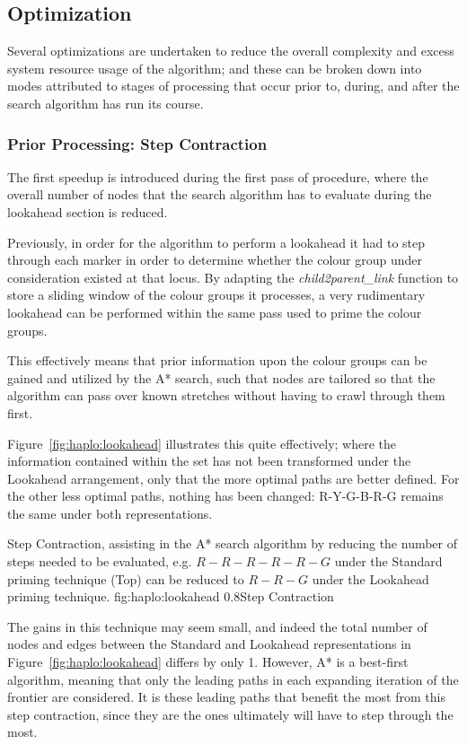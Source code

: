 \subsection{Optimization}

Several optimizations are undertaken to reduce the overall complexity and excess system resource usage of the algorithm; and these can be broken down into modes attributed to stages of processing that occur prior to, during, and after the search algorithm has run its course.

\subsubsection{Prior Processing: Step Contraction}

The first speedup is introduced during the first pass of procedure, where the overall number of nodes that the search algorithm has to evaluate during the lookahead section is reduced. 

Previously, in order for the algorithm to perform a lookahead it had to step through each marker in order to determine whether the colour group under consideration existed at that locus. By adapting the \textit{child2parent\_link} function to store a sliding window of the colour groups it processes, a very rudimentary lookahead can be performed within the same pass used to prime the colour groups.  

This effectively means that prior information upon the colour groups can be gained and utilized by the A* search, such that nodes are tailored so that the algorithm can pass over known stretches without having to crawl through them first.

Figure~\ref{fig:haplo:lookahead}  illustrates this quite effectively; where the information contained within the set has not been transformed under the Lookahead arrangement, only that the more optimal paths are better defined. For the other less optimal paths, nothing has been changed: R-Y-G-B-R-G remains the same under both representations.

	{Step Contraction, assisting in the A* search algorithm by reducing the number of steps needed to be evaluated, e.g. $R-R-R-R-R-G$ under the Standard priming technique (Top) can be reduced to $R-R-G$ under the Lookahead priming technique.}
	{fig:haplo:lookahead}
	{0.8}{Step Contraction}

The gains in this technique may seem small, and indeed the total number of nodes and edges between the Standard and Lookahead representations in Figure~\ref{fig:haplo:lookahead} differs by only 1. However, A* is a best-first algorithm, meaning that only the leading paths in each expanding iteration of the frontier are considered. It is these leading paths that benefit the most from this step contraction, since they are the ones ultimately will have to step through the most.

